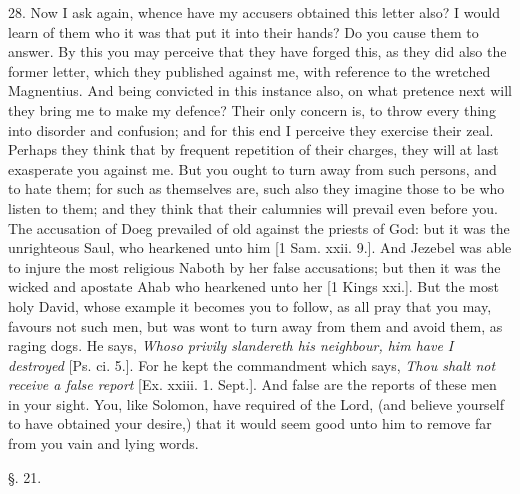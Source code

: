 28. Now I ask again, whence have my accusers obtained this letter also?
I would learn of them who it was that put it into their hands? Do you
cause them to answer. By this you may perceive that they have forged
this, as they did also the former letter, which they published against
me, with reference to the wretched Magnentius. And being convicted in
this instance also, on what pretence next will they bring me to make
my defence? Their only concern is, to throw every thing into disorder
and confusion; and for this end I perceive they exercise their zeal.
Perhaps they think that by frequent repetition of their charges, they
will at last exasperate you against me. But you ought to turn away
from such persons, and to hate them; for such as themselves are, such
also they imagine those to be who listen to them; and they think that
their calumnies will prevail even before you. The accusation of Doeg
prevailed of old against the priests of God: but it was the
unrighteous Saul, who hearkened unto him [1 Sam. xxii. 9.]. And
Jezebel was able to injure the most religious Naboth by her false
accusations; but then it was the wicked and apostate Ahab who
hearkened unto her [1 Kings xxi.]. But the most holy David, whose
example it becomes you to follow, as all pray that you may, favours
not such men, but was wont to turn away from them and avoid them, as
raging dogs. He says, \emph{Whoso
privily slandereth his neighbour, him have I destroyed}
[Ps. ci. 5.]. For he kept the commandment which says, \emph{Thou
shalt not receive a false report}
[Ex. xxiii. 1. Sept.]. And false are the reports of these men in your
sight. You, like Solomon, have required of the Lord, (and believe
yourself to have obtained your desire,) that it would seem good unto
him to remove far from you vain and lying words.

§. 21.

